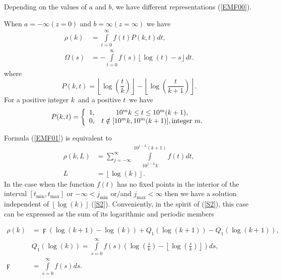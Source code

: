 \documentclass[titlepage,fleqn]{article}%
\begin{document}
Depending on the values of $a$ and $b$, we have different representations
(\ref{EMF00}).

When $a=-\infty(z=0)$ and $b=\infty(z=\infty)$ we have%
\begin{align}
\rho(k)  &  =%
{\displaystyle\int\limits_{t=0}^{\infty}}
f(t)P(k,t)dt,\label{EMF01}\\
\Omega(s)  &  =-%
{\displaystyle\int\limits_{t=0}^{\infty}}
f(s)\left\lfloor \log\left(  t\right)  -s\right\rfloor dt. \label{EMF01a}%
\end{align}
where%
\begin{equation}
P(k,t)=\left\lfloor \log\left(  \frac{t}{k}\right)  \right\rfloor
-\left\lfloor \log\left(  \frac{t}{k+1}\right)  \right\rfloor . \label{EMF02}%
\end{equation}
For a positive integer $k$\ and a positive $t$\ we have
\begin{equation}
P(k,t)=\left\{
\begin{array}
[c]{cc}%
1, & 10^{m}k\leq t\leq10^{m}(k+1),\\
0, & t\notin\lbrack10^{m}k,10^{m}(k+1)],\text{integer }m.
\end{array}
\right.  \label{EMF02a}%
\end{equation}


Formula (\ref{EMF01}) is equivalent to%
\begin{align}
\rho(k,L)  &  =%
{\displaystyle\sum\limits_{j=-\infty}^{\infty}}
{\displaystyle\int\limits_{10^{j-L}k}^{10^{j-L}(k+1)}}
f(t)dt,\label{EMF01b}\\
L  &  =\left\lfloor \log\left(  k\right)  \right\rfloor .\nonumber
\end{align}
In the case when the function $f(t)$ has no fixed points in the interior of
the interval $[t_{\min},t_{\max}]$ or $-\infty<j_{\min}$ or/and $j_{\max
}<\infty$ then we have a solution independent of $\left\lfloor \log\left(
k\right)  \right\rfloor $ (\ref{S2}). Conveniently, in the spirit of
(\ref{S2}), this case can be expressed as the sum of its logarithmic and
periodic members%

\begin{align}
\rho(k)  &  =\digamma\left(  \log(k+1)-\log(k)\right)  +Q_{1}(\log
(k+1))-Q_{1}(\log(k+1)),\label{EMF03}\\
&  Q_{1}(\log(k))=%
{\displaystyle\int\limits_{s=0}^{\infty}}
f(s)\left(  \log\left(  \frac{s}{k}\right)  -\left\lfloor \log\left(  \frac
{s}{k}\right)  \right\rfloor \right)  ds,\label{EMF03a}\\
\digamma &  =%
{\displaystyle\int\limits_{s=0}^{\infty}}
f(s)ds.
\end{align}
\end{document}
